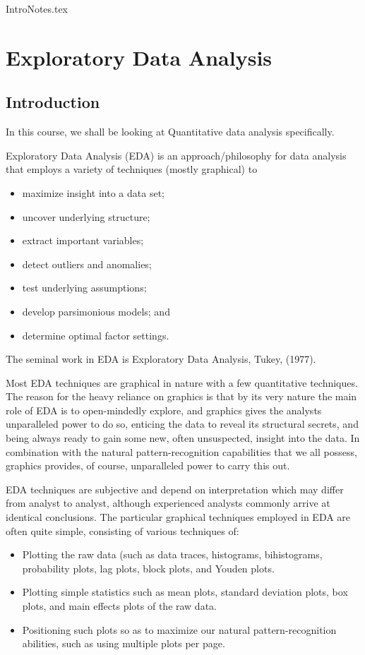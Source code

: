 IntroNotes.tex


\chapter{Exploratory Data Analysis}

\section{Introduction}
In this course, we shall be looking at Quantitative data analysis specifically.



Exploratory Data Analysis (EDA) is an approach/philosophy for data analysis that employs a variety of techniques (mostly graphical) to
\begin{itemize}
\item maximize insight into a data set;
\item uncover underlying structure;
\item extract important variables;
\item detect outliers and anomalies;
\item test underlying assumptions;
\item develop parsimonious models; and
\item determine optimal factor settings.
\end{itemize}

The seminal work in EDA is Exploratory Data Analysis, Tukey, (1977).

Most EDA techniques are graphical in nature with a few quantitative techniques. The reason for the heavy reliance on graphics is that by its very nature the main role of EDA is to open-mindedly explore, and graphics gives the analysts unparalleled power to do so, enticing the data to reveal its structural secrets, and being always ready to gain some new, often unsuspected, insight into the data. In combination with the natural pattern-recognition capabilities that we all possess, graphics provides, of course, unparalleled power to carry this out.

EDA techniques are subjective and depend on interpretation which may differ from analyst to analyst, although experienced analysts commonly arrive at identical conclusions. The particular graphical techniques employed in EDA are often quite simple, consisting of various techniques of:
\begin{itemize}
\item Plotting the raw data (such as data traces, histograms, bihistograms, probability plots, lag plots, block plots, and Youden plots.

\item Plotting simple statistics such as mean plots, standard deviation plots, box plots, and main effects plots of the raw data.

\item Positioning such plots so as to maximize our natural pattern-recognition abilities, such as using multiple plots per page.
\end{itemize}

